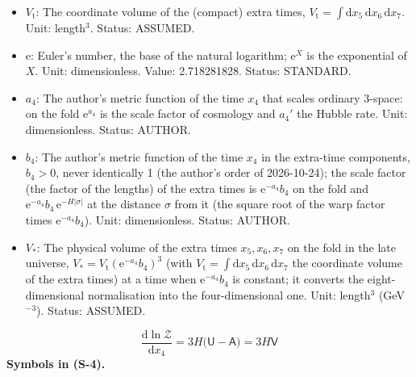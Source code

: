 \documentclass[
  10pt,
]{article}
\begin{document}
\begin{itemize}
  gravity of our world, on the fold),
  \(G_{\mathrm{N}} = 1/M_{\mathrm{Pl}}^2\) with the Planck mass
  \(M_{\mathrm{Pl}} = 1.221\times10^{19}\) GeV. Unit: GeV\(^{-2}\).
  Value: \(6.708\times10^{-39}\) GeV\(^{-2}\). Status: STANDARD.
\item
  \(V_{\mathrm{t}}\): The coordinate volume of the (compact) extra
  times,
  \(V_{\mathrm{t}} = \int\mathrm{d}x_5\,\mathrm{d}x_6\,\mathrm{d}x_7\).
  Unit: length\(^3\). Status: ASSUMED.
\item
  \(\mathrm{e}\): Euler's number, the base of the natural logarithm;
  \(\mathrm{e}^{X}\) is the exponential of \(X\). Unit: dimensionless.
  Value: 2.718281828. Status: STANDARD.
\item
  \(a_4\): The author's metric function of the time \(x_4\) that scales
  ordinary 3-space: on the fold \(\mathrm{e}^{a_4}\) is the scale factor
  of cosmology and \(a_4'\) the Hubble rate. Unit: dimensionless.
  Status: AUTHOR.
\item
  \(b_4\): The author's metric function of the time \(x_4\) in the
  extra-time components, \(b_4 > 0\), never identically 1 (the author's
  order of 2026-10-24); the scale factor (the factor of the lengths) of
  the extra times is \(\mathrm{e}^{-a_4}b_4\) on the fold and
  \(\mathrm{e}^{-a_4}b_4\,\mathrm{e}^{-H\lvert\sigma\rvert}\) at the
  distance \(\sigma\) from it (the square root of the warp factor times
  \(\mathrm{e}^{-a_4}b_4\)). Unit: dimensionless. Status: AUTHOR.
\item
  \(V_*\): The physical volume of the extra times \(x_5, x_6, x_7\) on
  the fold in the late universe,
  \(V_* = V_{\mathrm{t}}(\mathrm{e}^{-a_4}b_4)^3\) (with
  \(V_{\mathrm{t}} = \int\mathrm{d}x_5\,\mathrm{d}x_6\,\mathrm{d}x_7\)
  the coordinate volume of the extra times) at a time when
  \(\mathrm{e}^{-a_4}b_4\) is constant; it converts the
  eight-dimensional normalisation into the four-dimensional one. Unit:
  length\(^3\) (GeV\(^{-3}\)). Status: ASSUMED.
\end{itemize}

\[
\frac{\mathrm{d}\ln\mathcal{Z}}{\mathrm{d}x_4} = 3H\big(\mathsf{U} - \mathsf{A}\big) = 3H\mathsf{V} \tag{S-4}
\] \textbf{Symbols in (S-4).}
\end{document}
